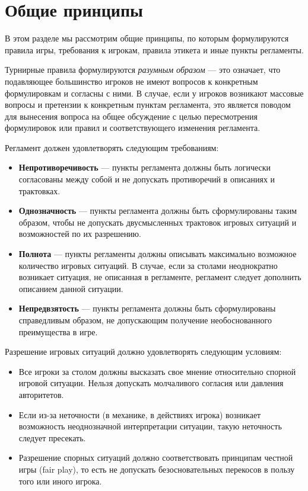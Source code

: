 \section{Общие принципы}

В этом разделе мы рассмотрим общие принципы, по которым формулируются правила игры, требования к игрокам, правила этикета и иные пункты регламенты.

Турнирные правила формулируются \textit{разумным образом} --- это означает, что подавляющее большинство игроков не имеют вопросов к конкретным формулировкам и согласны с ними. В случае, если у игроков возникают массовые вопросы и претензии к конкретным пунктам регламента, это является поводом для вынесения вопроса на общее обсуждение с целью пересмотрения формулировок или правил и соответствующего изменения регламента.

Регламент должен удовлетворять следующим требованиям:
\begin{itemize}
	\item \textbf{Непротиворечивость} --- пункты регламента должны быть логически согласованы между собой и не допускать противоречий в описаниях и трактовках.
	\item \textbf{Однозначность} --- пункты регламента должны быть сформулированы таким образом, чтобы не допускать двусмысленных трактовок игровых ситуаций и возможностей по их разрешению.
	\item \textbf{Полнота} --- пункты регламенты должны описывать максимально возможное количество игровых ситуаций. В случае, если за столами неоднократно возникает ситуация, не описанная в регламенте, регламент следует дополнить описанием данной ситуации.
	\item \textbf{Непредвзятость} --- пункты регламента должны быть сформулированы справедливым образом, не допускающим получение необоснованного преимущества в игре.
\end{itemize}

Разрешение игровых ситуаций должно удовлетворять следующим условиям:
\begin{itemize}
	\item Все игроки за столом должны высказать свое мнение относительно спорной игровой ситуации. Нельзя допускать молчаливого согласия или давления авторитетов.
	\item Если из-за неточности (в механике, в действиях игрока) возникает возможность неоднозначной интерпретации ситуации, такую неточность следует пресекать.
	\item Разрешение спорных ситуаций должно соответствовать принципам честной игры (fair play), то есть не допускать безосновательных перекосов в пользу того или иного игрока.
\end{itemize}

